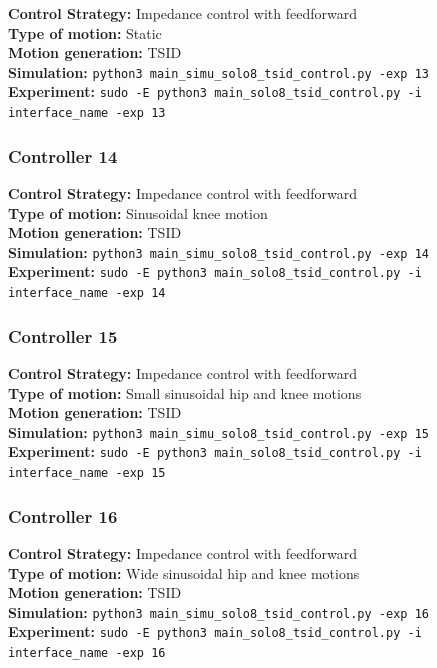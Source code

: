 \documentclass[12pt,a4paper]{article}
\begin{document}
\textbf{Control Strategy:} Impedance control with feedforward \\
\textbf{Type of motion:} Static \\
\textbf{Motion generation:} TSID \\
\textbf{Simulation:} \texttt{python3 main\_simu\_solo8\_tsid\_control.py -exp 13} \\
\textbf{Experiment:} \texttt{sudo -E python3 main\_solo8\_tsid\_control.py -i interface\_name -exp 13} \\

\subsubsection{Controller 14}

\textbf{Control Strategy:} Impedance control with feedforward \\
\textbf{Type of motion:} Sinusoidal knee motion \\
\textbf{Motion generation:} TSID \\
\textbf{Simulation:} \texttt{python3 main\_simu\_solo8\_tsid\_control.py -exp 14} \\
\textbf{Experiment:} \texttt{sudo -E python3 main\_solo8\_tsid\_control.py -i interface\_name -exp 14} \\

\subsubsection{Controller 15}

\textbf{Control Strategy:} Impedance control with feedforward \\
\textbf{Type of motion:} Small sinusoidal hip and knee motions \\
\textbf{Motion generation:} TSID \\
\textbf{Simulation:} \texttt{python3 main\_simu\_solo8\_tsid\_control.py -exp 15} \\
\textbf{Experiment:} \texttt{sudo -E python3 main\_solo8\_tsid\_control.py -i interface\_name -exp 15} \\

\subsubsection{Controller 16}

\textbf{Control Strategy:} Impedance control with feedforward \\
\textbf{Type of motion:} Wide sinusoidal hip and knee motions \\
\textbf{Motion generation:} TSID \\
\textbf{Simulation:} \texttt{python3 main\_simu\_solo8\_tsid\_control.py -exp 16} \\
\textbf{Experiment:} \texttt{sudo -E python3 main\_solo8\_tsid\_control.py -i interface\_name -exp 16} \\
\end{document}
